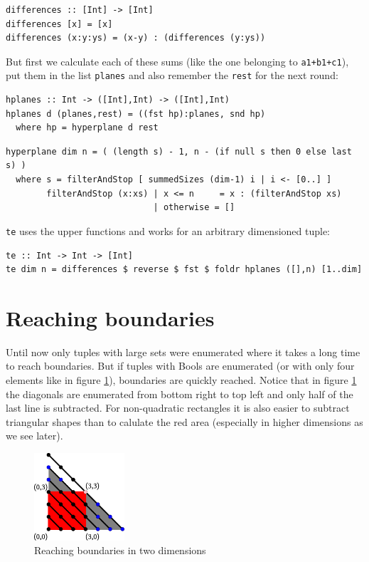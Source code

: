 \documentclass{tmr}
\begin{document}
\begin{Verbatim}
differences :: [Int] -> [Int]
differences [x] = [x]
differences (x:y:ys) = (x-y) : (differences (y:ys))
\end{Verbatim}

But first we calculate each of these sums (like the one belonging to \verb|a1+b1+c1|), put them in the list \verb|planes| and also remember the \verb|rest| for the next round:

\begin{Verbatim}
hplanes :: Int -> ([Int],Int) -> ([Int],Int)
hplanes d (planes,rest) = ((fst hp):planes, snd hp)
  where hp = hyperplane d rest
\end{Verbatim}

\begin{Verbatim}
hyperplane dim n = ( (length s) - 1, n - (if null s then 0 else last s) )
  where s = filterAndStop [ summedSizes (dim-1) i | i <- [0..] ]
        filterAndStop (x:xs) | x <= n     = x : (filterAndStop xs)
                             | otherwise = []
\end{Verbatim}

\verb|te| uses the upper functions and works for an arbitrary dimensioned tuple:

\begin{Verbatim}
te :: Int -> Int -> [Int]
te dim n = differences $ reverse $ fst $ foldr hplanes ([],n) [1..dim]
\end{Verbatim}


\section{Reaching boundaries}
Until now only tuples with large sets were enumerated where it takes a long time to reach boundaries. But if tuples with Bools are enumerated (or with only four elements like in figure \ref{enum2bounded}), boundaries are quickly reached. Notice that in figure \ref{enum2bounded} the diagonals are enumerated from bottom right to top left and only half of the last line is subtracted. For non-quadratic rectangles it is also easier to subtract triangular shapes than to calulate the red area (especially in higher dimensions as we see later).

\begin{figure}[htbp]
  \centering
    \includegraphics[width=0.3\textwidth]{en.pdf}
    \caption{Reaching boundaries in two dimensions }
  \label{enum2bounded}
\end{figure}
\end{document}

